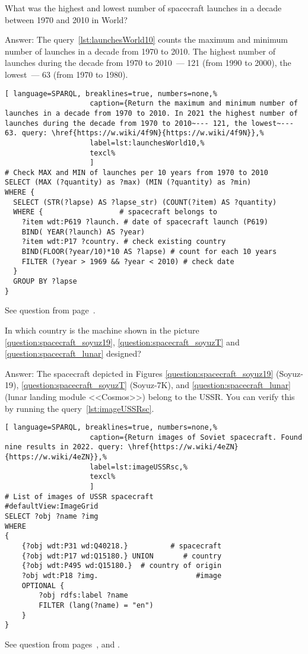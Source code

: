\label{answer:max-min-space-launches}
\begin{exercise}
	What was the highest and lowest number of spacecraft launches in a decade between 1970 and 2010 in World?
\end{exercise}
Answer: The query~\ref{lst:launchesWorld10} counts the maximum and minimum number of launches in a decade from 1970 to 2010. The highest number of launches during the decade from 1970 to 2010~--- 121 (from 1990 to 2000), the lowest~--- 63 (from 1970 to 1980).
\begin{lstlisting}[ language=SPARQL, breaklines=true, numbers=none,%
                    caption={Return the maximum and minimum number of launches in a decade from 1970 to 2010. In 2021 the highest number of launches during the decade from 1970 to 2010~--- 121, the lowest~--- 63. query: \href{https://w.wiki/4f9N}{https://w.wiki/4f9N}},%
                    label=lst:launchesWorld10,%
                    texcl%
                    ]
# Check MAX and MIN of launches per 10 years from 1970 to 2010
SELECT (MAX (?quantity) as ?max) (MIN (?quantity) as ?min)
WHERE {
  SELECT (STR(?lapse) AS ?lapse_str) (COUNT(?item) AS ?quantity)
  WHERE {                  # spacecraft belongs to
    ?item wdt:P619 ?launch. # date of spacecraft launch (P619)
    BIND( YEAR(?launch) AS ?year) 
    ?item wdt:P17 ?country. # check existing country
    BIND(FLOOR(?year/10)*10 AS ?lapse) # count for each 10 years
    FILTER (?year > 1969 && ?year < 2010) # check date
  } 
  GROUP BY ?lapse
}
\end{lstlisting}%
\small{See question from page~\pageref{question:spacecraft_2}.}

\label{answer:spacecraft_USSR}
\begin{exercise}
	In which country is the machine shown in the picture \ref{question:spacecraft_soyuz19}, \ref{question:spacecraft_soyuzT} and \ref{question:spacecraft_lunar} designed?
\end{exercise}
Answer: The spacecraft depicted in Figures \ref{question:spacecraft_soyuz19} (Soyuz-19), \ref{question:spacecraft_soyuzT} (Soyuz-7K), and \ref{question:spacecraft_lunar} (lunar landing module <<Cosmos>>) belong to the USSR. You can verify this by running the query~\ref{lst:imageUSSRsc}.
\begin{lstlisting}[ language=SPARQL, breaklines=true, numbers=none,%
                    caption={Return images of Soviet spacecraft. Found nine results in 2022. query: \href{https://w.wiki/4eZN}{https://w.wiki/4eZN}},%
                    label=lst:imageUSSRsc,%
                    texcl%
                    ]
# List of images of USSR spacecraft
#defaultView:ImageGrid
SELECT ?obj ?name ?img
WHERE
{
    {?obj wdt:P31 wd:Q40218.}          # spacecraft
    {?obj wdt:P17 wd:Q15180.} UNION       # country
    {?obj wdt:P495 wd:Q15180.}  # country of origin
    ?obj wdt:P18 ?img.                       #image
    OPTIONAL {
		?obj rdfs:label ?name 
		FILTER (lang(?name) = "en")
	}
}
\end{lstlisting}%
\small{See question from pages~\pageref{question:spacecraft_soyuz19}, \pageref{question:spacecraft_soyuzT} and \pageref{question:spacecraft_lunar}.}

